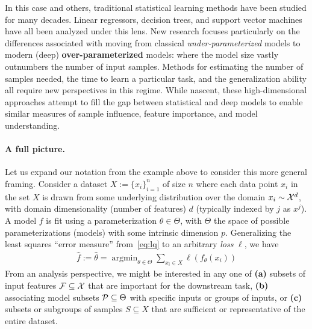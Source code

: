 In this case and others, traditional statistical learning methods 
have been studied 
for many decades.
Linear regressors, decision trees, and support vector machines
have all been analyzed under this lens.
New research focuses
particularly on the differences
associated with moving from classical \textit{under-parameterized} models to
modern (deep) \textbf{over-parameterized} models: where
the model size vastly outnumbers the number
of input samples.
Methods for estimating the number of samples needed,
the time to learn a particular task,
and the generalization ability 
all require new perspectives in this regime.
While nascent, these high-dimensional approaches
attempt to fill the gap between
statistical and deep models to enable similar measures of sample influence, feature importance, and model understanding. 

\paragraph{A full picture.}
Let us expand our notation from the example above to consider this more general framing.
Consider a dataset $X:=\{x_i\}_{i=1}^n$ of size $n$ where each data point $x_i$ in the set $X$ is drawn from some underlying distribution over the domain $x_i \sim \mathcal{X}^d$, 
with domain dimensionality (number of features) $d$ (typically indexed by $j$ as $x^j$).
A model $f$ is fit using a parameterization $\theta \in \Theta$,
with $\Theta$ the space of possible parameterizations (models) with some intrinsic dimension $p$. 
Generalizing the least squares ``error measure'' from~\eqref{eq:lq} to an arbitrary \textit{loss} $\ell$, we have
\begin{align}\label{eq:learning}
    \hat{f}:=\hat{\theta} = \mathop{\arg\min}_{\theta\in\Theta} \sum_{x_i \in X} \ell(f_\theta(x_i))
\end{align}
From an analysis perspective, 
we might be interested in any one of 
\textbf{(a)} subsets of input features $\mathcal{F} \subseteq \mathcal{X}$ that are important for the downstream task,
\textbf{(b)} associating model subsets $\mathcal{P} \subseteq \Theta$ with specific inputs or groups of inputs, or 
\textbf{(c)} subsets or subgroups of samples $S \subseteq X$ that are sufficient or representative of the entire dataset.

